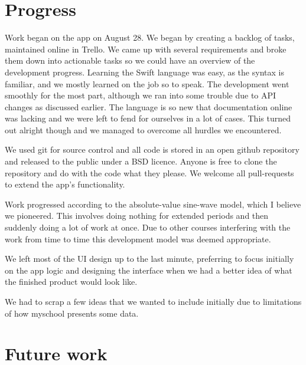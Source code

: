 \documentclass[pdftex, DIV=calc, paper=a4, fontsize=11pt, twocolumn]{scrartcl}	 %
\begin{document}

\section*{Progress}

Work began on the app on August 28. We began by creating a backlog of tasks, maintained online in
Trello. We came up with several requirements and broke them down into actionable tasks so we could
have an overview of the development progress. Learning the Swift language was easy, as the syntax
is familiar, and we mostly learned on the job so to speak. The development went smoothly for the
most part, although we ran into some trouble due to API changes as discussed earlier. The language
is so new that documentation online was lacking and we were left to fend for ourselves in a lot of 
cases. This turned out alright though and we managed to overcome all hurdles we encountered.

We used git for source control and all code is stored in an open github repository and released
to the public under a BSD licence. Anyone is free to clone the repository and do with the code what
they please. We welcome all pull-requests to extend the app's functionality.

Work progressed according to the absolute-value sine-wave model, which I believe we pioneered. This 
involves doing nothing for extended periods and then suddenly doing a lot of work at once. Due to 
other courses interfering with the work from time to time this development model was deemed 
appropriate.

We left most of the UI design up to the last minute, preferring to focus initially on the app logic
and designing the interface when we had a better idea of what the finished product would look like.

We had to scrap a few ideas that we wanted to include initially due to limitations of how myschool
presents some data.


\section*{Future work}
\end{document}
